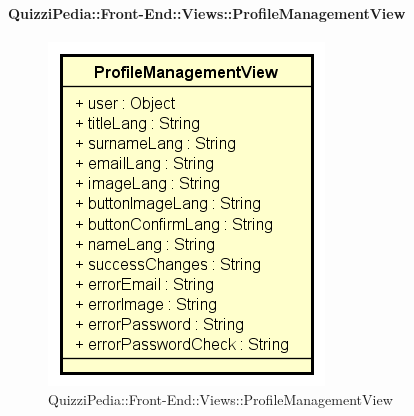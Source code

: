 \paragraph{QuizziPedia::Front-End::Views::ProfileManagementView}
\begin{figure} [ht]
	\centering
	\includegraphics[scale=0.80]{UML/Classi/Front-End/QuizziPedia_Front-end_Views_ProfileManagementView.png}
	\caption{QuizziPedia::Front-End::Views::ProfileManagementView}
\end{figure} \FloatBarrier
